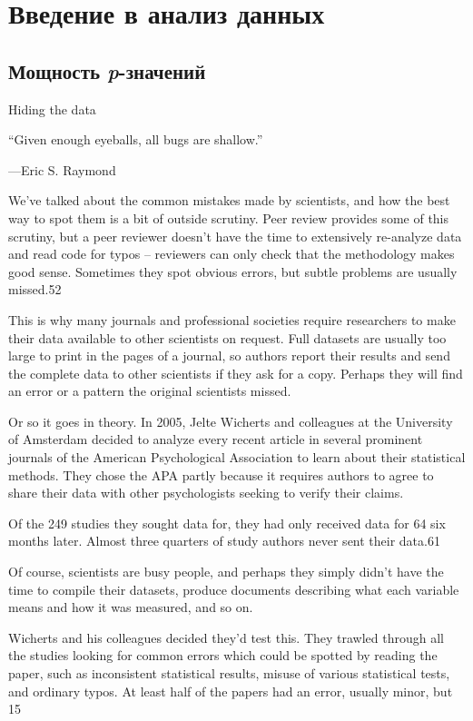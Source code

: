 \chapter{Введение в анализ данных}
\label{chp10}

\section{Мощность \emph{p}-значений}
\label{chp10: }

Hiding the data

    “Given enough eyeballs, all bugs are shallow.”

    —Eric S. Raymond

We’ve talked about the common mistakes made by scientists, and how the best way to spot them is a bit of outside scrutiny. Peer review provides some of this scrutiny, but a peer reviewer doesn’t have the time to extensively re-analyze data and read code for typos – reviewers can only check that the methodology makes good sense. Sometimes they spot obvious errors, but subtle problems are usually missed.52

This is why many journals and professional societies require researchers to make their data available to other scientists on request. Full datasets are usually too large to print in the pages of a journal, so authors report their results and send the complete data to other scientists if they ask for a copy. Perhaps they will find an error or a pattern the original scientists missed.

Or so it goes in theory. In 2005, Jelte Wicherts and colleagues at the University of Amsterdam decided to analyze every recent article in several prominent journals of the American Psychological Association to learn about their statistical methods. They chose the APA partly because it requires authors to agree to share their data with other psychologists seeking to verify their claims.

Of the 249 studies they sought data for, they had only received data for 64 six months later. Almost three quarters of study authors never sent their data.61

Of course, scientists are busy people, and perhaps they simply didn’t have the time to compile their datasets, produce documents describing what each variable means and how it was measured, and so on.

Wicherts and his colleagues decided they’d test this. They trawled through all the studies looking for common errors which could be spotted by reading the paper, such as inconsistent statistical results, misuse of various statistical tests, and ordinary typos. At least half of the papers had an error, usually minor, but 15%

